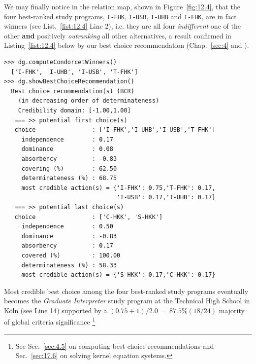 We may finally notice in the relation map, shown in Figure~\vref{fig:12.4}, that the four best-ranked study programs, \texttt{I-FHK}, \texttt{I-USB}, \texttt{I-UHB} and \texttt{T-FHK},  are in fact \Condorcet winners (see List.~\vref{list:12.4} Line 2), i.e. they are all four \emph{indifferent} one of the other \textbf{and} positively \emph{outranking} all other alternatives, a result confirmed in Listing~\vref{list:12.4} below by our \Rubis best choice recommendation (Chap.~\ref{sec:4} and \citealp*{BIS-2008a}).
\begin{lstlisting}[caption={Alice's best choice recommendation},label=list:12.4]
>>> dg.computeCondorcetWinners()
  ['I-FHK', 'I-UHB', 'I-USB', 'T-FHK'] 
>>> dg.showBestChoiceRecommendation()
  Best choice recommendation(s) (BCR)
    (in decreasing order of determinateness)   
    Credibility domain: [-1.00,1.00]
   === >> potential first choice(s)
   choice                : ['I-FHK','I-UHB','I-USB','T-FHK']
     independence        : 0.17
     dominance           : 0.08
     absorbency          : -0.83
     covering (%)        : 62.50
     determinateness (%) : 68.75
     most credible action(s) = {'I-FHK': 0.75,'T-FHK': 0.17,
                                'I-USB': 0.17,'I-UHB': 0.17}
   === >> potential last choice(s) 
   choice                : ['C-HKK', 'S-HKK']
     independence        : 0.50
     dominance           : -0.83
     absorbency          : 0.17
     covered (%)         : 100.00
     determinateness (%) : 58.33
     most credible action(s) = {'S-HKK': 0.17,'C-HKK': 0.17}
\end{lstlisting}

Most credible best choice among the four best-ranked study programs eventually becomes the \emph{Graduate Interpreter} study program at the Technical High School in Köln (see Line 14) supported by a $(0.75 + 1)/2.0 \,=\,87.5\% (18/24)$ majority of global criteria significance \footnote{See Sec.~\ref{sec:4.5} on computing best choice recommendations and Sec.~\ref{sec:17.6} on solving kernel equation systems.}

